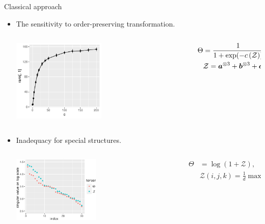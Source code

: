 \documentclass[10pt, mathserif]{beamer} %
\theoremstyle{definition}
\theoremstyle{plain}
\begin{document}
\begin{frame}{Classical approach}
 \begin{itemize}         
    \item The sensitivity to order-preserving transformation.
      \begin{columns}
\begin{column}{0.6\textwidth}
   \begin{center}
     \includegraphics[width=0.5\textwidth]{example1.pdf}
     \end{center}
\end{column}
\begin{column}{0.5\textwidth} 
\begin{align}\Theta &= {1\over 1+\exp(-c\left(\mathcal{Z}\right))},\quad\text{ where }\\&\mathcal{Z} = \bm a^{\otimes3}+ \bm b^{\otimes3}+ \bm c^{\otimes3}.\end{align}

\end{column}
\end{columns}
      
      
    \item Inadequacy for special structures.
      \begin{columns}
\begin{column}{0.7\textwidth}
   \begin{center}
     \includegraphics[width=0.5\textwidth]{example2.pdf}
     \end{center}
\end{column}
\begin{column}{0.5\textwidth}  %
\begin{align}\Theta &= \log(1+\mathcal{Z}),\quad\text{ where }\\&\mathcal{Z}(i,j,k) = \frac{1}{d}\max(i,j,k). \text{ }\hspace{1cm} \end{align}


\end{column}
\end{columns}
\end{itemize}
\end{frame}
\end{document}
